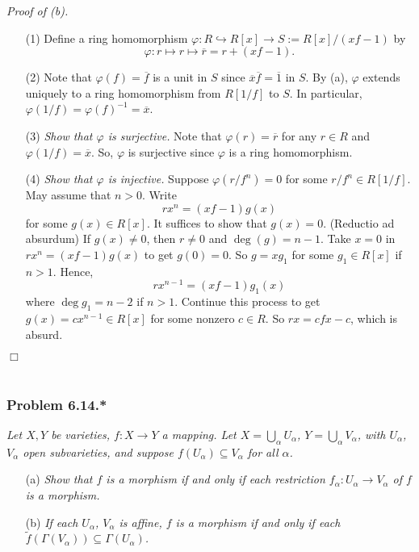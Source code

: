 \documentclass{article}
\begin{document}
\emph{Proof of (b).}
\begin{enumerate}
\item[(1)]
  Define a ring homomorphism $\varphi: R \hookrightarrow R[x] \to S := R[x]/(xf-1)$
  by
  \[
    \varphi: r \mapsto r \mapsto \overline{r} = r + (xf-1).
  \]

\item[(2)]
  Note that $\varphi(f) = \overline{f}$ is a unit in $S$
  since $\overline{x}\overline{f} = \overline{1}$ in $S$.
  By (a), $\varphi$ extends uniquely to a ring homomorphism from $R[1/f]$ to $S$.
  In particular, $\varphi(1/f) = \varphi(f)^{-1} = \overline{x}$.

\item[(3)]
  \emph{Show that $\varphi$ is surjective.}
  Note that $\varphi(r) = \overline{r}$ for any $r \in R$
  and $\varphi(1/f) = \overline{x}$.
  So, $\varphi$ is surjective since $\varphi$ is a ring homomorphism.

\item[(4)]
  \emph{Show that $\varphi$ is injective.}
  Suppose $\varphi(r/f^n) = 0$ for some $r/f^n \in R[1/f]$.
  May assume that $n > 0$.
  Write
  \[
    rx^n = (xf - 1)g(x)
  \]
  for some $g(x) \in R[x]$.
  It suffices to show that $g(x) = 0$.
  (Reductio ad absurdum)
  If $g(x) \neq 0$, then $r \neq 0$ and $\deg(g) = n-1$.
  Take $x = 0$ in $rx^n = (xf - 1)g(x)$ to get $g(0) = 0$.
  So $g = x g_1$ for some $g_1 \in R[x]$ if $n > 1$.
  Hence,
  \[
    rx^{n-1} = (xf - 1)g_1(x)
  \]
  where $\deg g_1 = n-2$ if $n > 1$.
  Continue this process to get $g(x) = cx^{n-1} \in R[x]$ for some nonzero $c \in R$.
  So $rx = cfx - c$, which is absurd.
\end{enumerate}
$\Box$ \\\\







\subsubsection*{Problem 6.14.*}
\emph{Let $X, Y$ be varieties, $f : X \to Y$ a mapping.
Let $X = \bigcup_{\alpha} U_\alpha$, $Y = \bigcup_{\alpha} V_\alpha$,
with $U_\alpha$, $V_\alpha$ open subvarieties,
and suppose $f(U_\alpha) \subseteq V_\alpha$ for all $\alpha$.}
\begin{enumerate}
\item[(a)]
  \emph{Show that $f$ is a morphism if and only if
  each restriction $f_\alpha: U_\alpha \to V_\alpha$ of $f$ is a morphism.}

\item[(b)]
  \emph{If each $U_\alpha$, $V_\alpha$ is affine,
  $f$ is a morphism if and only if
  each $\widetilde{f}(\Gamma(V_\alpha)) \subseteq \Gamma(U_\alpha)$.} \\
\end{enumerate}
\end{document}
